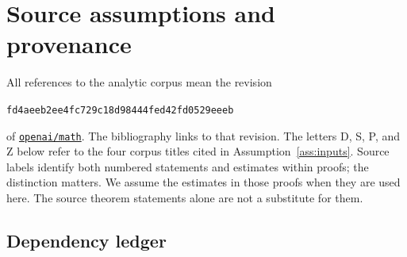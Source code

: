 \appendix
\section{Source assumptions and provenance}\label{sec:sources}

All references to the analytic corpus mean the revision
\begin{center}
\texttt{fd4aeeb2ee4fc729c18d98444fed42fd0529eeeb}
\end{center}
of \href{https://github.com/openai/math/tree/fd4aeeb2ee4fc729c18d98444fed42fd0529eeeb}{\texttt{openai/math}}.
The bibliography links to that revision. The letters D, S, P, and Z
below refer to the four corpus titles cited in
Assumption~\ref{ass:inputs}. Source labels identify both numbered
statements and estimates within proofs; the distinction matters.
We assume the estimates in those proofs when they are used here.
The source theorem statements alone are not a substitute for them.

\subsection{Dependency ledger}

